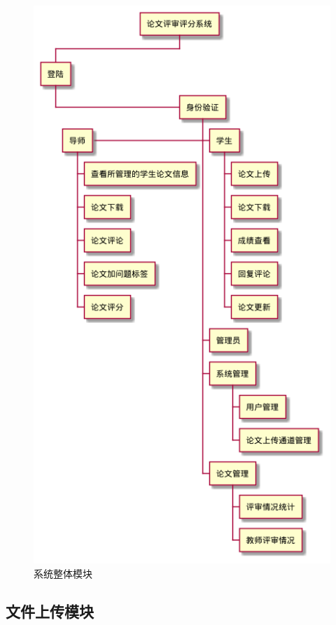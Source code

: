 \begin{figure}[H]
    \centering
    \includegraphics[scale = 0.6]{out/uml/WBS/系统WBS/系统WBS.png}
    \caption{\song\wuhao 系统整体模块}
    \label{system-wbs}
\end{figure}

\subsection{文件上传模块}

